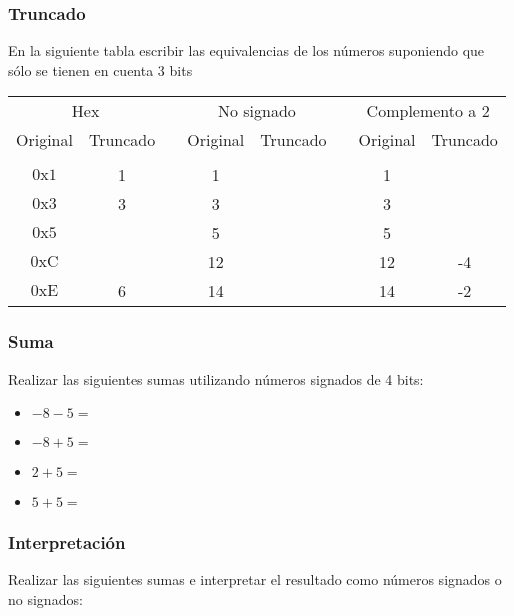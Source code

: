 \subsubsection{Truncado}
En la siguiente tabla escribir las equivalencias de los números suponiendo que sólo se tienen en cuenta 3 bits\\

\begin{tabular}{cccccccc}
  \multicolumn{2}{c}{Hex} & &\multicolumn{2}{c}{No signado}& &\multicolumn{2}{c}{Complemento a 2}\\
  Original&Truncado&&Original&Truncado&&Original&Truncado\\
  \cline{1-2}\cline{4-5}\cline{7-8}\\
  $\mathrm{0x1}$&1          &&1  &\underspace&&1 & \underspace \\
  $\mathrm{0x3}$&3          &&3  &\underspace&&3 & \underspace \\
  $\mathrm{0x5}$&\underspace&&5  &\underspace&&5 & \underspace \\
  $\mathrm{0xC}$&\underspace&&12 &\underspace&&12& -4\\
  $\mathrm{0xE}$&6          &&14 &\underspace&&14& -2\\
\end{tabular}

\subsubsection{Suma}
Realizar las siguientes sumas utilizando números signados de 4 bits:
\begin{itemize}
  \item $ -8-5= $
  \item $-8+5 = $
  \item $2+5  = $
  \item $5+5  = $
\end{itemize}

\subsubsection{Interpretación}
Realizar las siguientes sumas e interpretar el resultado como números signados o no signados:\\

